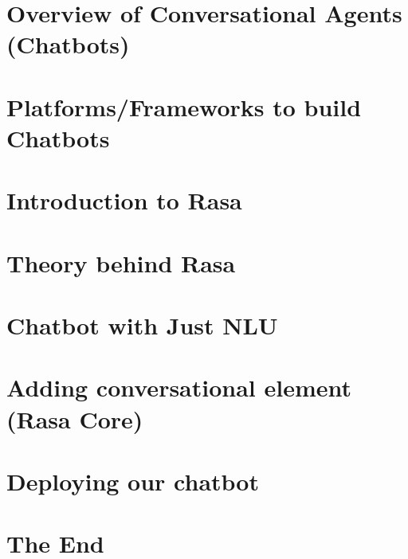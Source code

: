 \section[Overview]{Overview of Conversational Agents (Chatbots)}


\section[Platforms]{Platforms/Frameworks to build Chatbots}



\section[Intro]{Introduction to Rasa}



\section[Theory]{Theory behind Rasa}



\section[NLU]{Chatbot with Just NLU}



\section[Core]{Adding conversational element (Rasa Core)}



\section[Deploy]{Deploying our chatbot}

\section[End]{The End}

